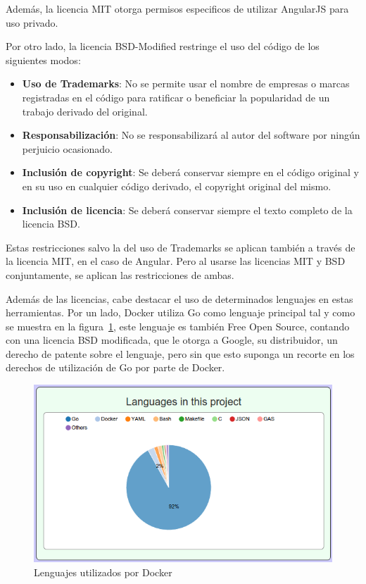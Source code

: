 \documentclass[a4paper, spanish, 12pt]{book}
\begin{document}
Adem\'as, la licencia MIT otorga permisos especificos de utilizar AngularJS para uso privado.

Por otro lado, la licencia BSD-Modified restringe el uso del c\'odigo de los siguientes modos:

\begin{itemize}
	\item \textbf{Uso de Trademarks}: No se permite usar el nombre de empresas o marcas registradas en el c\'odigo
	para ratificar o beneficiar la popularidad de un trabajo derivado del original.

	\item \textbf{Responsabilizaci\'on}: No se responsabilizar\'a al autor del software por ning\'un perjuicio ocasionado.

	\item \textbf{Inclusi\'on de copyright}: Se deber\'a conservar siempre en el c\'odigo original y en su uso
	en cualquier c\'odigo derivado, el copyright original del mismo.

	\item \textbf{Inclusi\'on de licencia}: Se deber\'a conservar siempre el texto completo de la licencia BSD.
\end{itemize}

Estas restricciones salvo la del uso de Trademarks se aplican tambi\'en a trav\'es de la licencia MIT, en el caso de Angular.
Pero al usarse las licencias MIT y BSD conjuntamente, se aplican las restricciones de ambas.

Adem\'as de las licencias, cabe destacar el uso de determinados lenguajes en estas herramientas. Por un lado, Docker utiliza
Go como lenguaje principal tal y como se muestra en la figura~\ref{fig:docker_lang}, este lenguaje es tambi\'en Free Open Source,
contando con una licencia BSD modificada, que le otorga a Google, su distribuidor, un derecho de patente sobre el lenguaje,
pero sin que esto suponga un recorte en los derechos de utilizaci\'on de Go por parte de Docker.

\begin{figure}
  \centering
  \includegraphics[width=14cm, keepaspectratio]{img/languages_docker}
  \caption{Lenguajes utilizados por Docker}
  \label{fig:docker_lang}
\end{figure}
\end{document}
